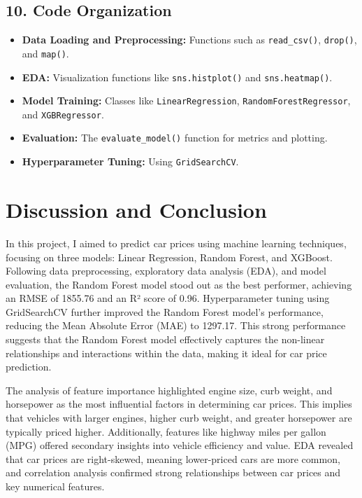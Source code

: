 \documentclass[journal]{IEEEtran}
\begin{document}
\subsection{10. Code Organization}

\begin{itemize}
    \item \textbf{Data Loading and Preprocessing:} Functions such as \texttt{read\_csv()}, \texttt{drop()}, and \texttt{map()}.
    \item \textbf{EDA:} Visualization functions like \texttt{sns.histplot()} and \texttt{sns.heatmap()}.
    \item \textbf{Model Training:} Classes like \texttt{LinearRegression}, \texttt{RandomForestRegressor}, and \texttt{XGBRegressor}.
    \item \textbf{Evaluation:} The \texttt{evaluate\_model()} function for metrics and plotting.
    \item \textbf{Hyperparameter Tuning:} Using \texttt{GridSearchCV}.
\end{itemize}
\section{Discussion and Conclusion}
In this project, I aimed to predict car prices using machine learning techniques, focusing on three models: Linear Regression, Random Forest, and XGBoost. Following data preprocessing, exploratory data analysis (EDA), and model evaluation, the Random Forest model stood out as the best performer, achieving an RMSE of 1855.76 and an R² score of 0.96. Hyperparameter tuning using GridSearchCV further improved the Random Forest model’s performance, reducing the Mean Absolute Error (MAE) to 1297.17. This strong performance suggests that the Random Forest model effectively captures the non-linear relationships and interactions within the data, making it ideal for car price prediction.

The analysis of feature importance highlighted engine size, curb weight, and horsepower as the most influential factors in determining car prices. This implies that vehicles with larger engines, higher curb weight, and greater horsepower are typically priced higher. Additionally, features like highway miles per gallon (MPG) offered secondary insights into vehicle efficiency and value. EDA revealed that car prices are right-skewed, meaning lower-priced cars are more common, and correlation analysis confirmed strong relationships between car prices and key numerical features.
\end{document}
